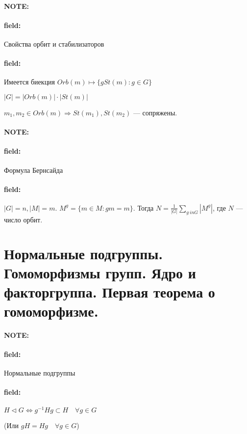 \documentclass[12pt]{article}
\newenvironment{note}{\paragraph{NOTE:}}{}
\newenvironment{field}{\paragraph{field:}}{}
\begin{document}
\begin{note}
  \begin{field}
    Свойства орбит и стабилизаторов
  \end{field}
  \begin{field}
    Имеется биекция $Orb(m) \mapsto \{g St(m) : g \in G\}$

    $|G| = |Orb(m)| \cdot |St(m)|$

    $m_{1}, m_{2} \in Orb(m) \Rightarrow St(m_{1}), St(m_{2})$ --- сопряжены.
  \end{field}
\end{note}

\begin{note}
  \begin{field}
    Формула Бернсайда
  \end{field}
  \begin{field}
    $|G| = n, |M| = m$.
    $M^{g} = \{m \in M : gm = m\}$.
    Тогда $N = \frac{1}{|G|} \sum_{g \ in G} |M^{g}|$, где $N$ --- число орбит.
  \end{field}
\end{note}

\section{Нормальные подгруппы. Гомоморфизмы групп. Ядро и факторгруппа. Первая
теорема о гомоморфизме.}

\begin{note}
  \begin{field}
    Нормальные подгруппы
  \end{field}
  \begin{field}
    $H \vartriangleleft G \Leftrightarrow g^{-1}Hg \subset H \quad{} \forall g \in G$

    (Или $gH = Hg \quad{} \forall g \in G$)
  \end{field}
\end{note}
\end{document}
